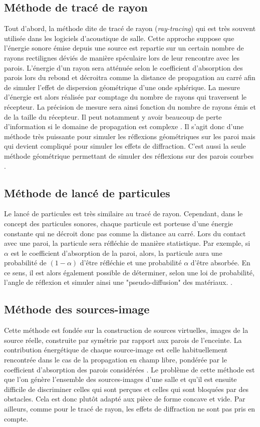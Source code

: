 	\subsection{Méthode de tracé de rayon}
Tout d'abord, la méthode dite de tracé de rayon (\textit{ray-tracing}) qui est très souvent utilisée dans les logiciels d'acoustique de salle. Cette approche suppose que l’énergie sonore émise depuis une source est repartie sur un certain nombre de rayons rectilignes déviés de manière spéculaire lors de leur rencontre avec les parois. L'énergie d'un rayon sera atténuée selon le coefficient d'absorption des parois lors du rebond et décroitra comme la distance de propagation au carré afin de simuler l'effet de dispersion géométrique d'une onde sphérique. La mesure d'énergie est alors réalisée par comptage du nombre de rayons qui traversent le récepteur. La précision de mesure sera ainsi fonction du nombre de rayons émis et de la taille du récepteur. Il peut notamment y avoir beaucoup de perte d'information si le domaine de propagation est complexe \cite[p. 60]{picaut}. Il s'agit donc d'une méthode très puissante pour simuler les réflexions géométriques sur les paroi mais qui devient compliqué pour simuler les effets de diffraction. C'est aussi la seule méthode géométrique permettant de simuler des réflexions sur des parois courbes \cite[p. 13]{Kandelman}.

	\subsection{Méthode de lancé de particules}
Le lancé de particules est très similaire au tracé de rayon. Cependant, dans le concept des particules sonores, chaque particule est porteuse d’une énergie constante qui ne décroit donc pas comme la distance au carré. Lors du contact avec une paroi, la particule sera réfléchie de manière statistique. Par exemple, si $\alpha$ est le coefficient d'absorption de la paroi, alors, la particule aura une probabilité de $(1-\alpha)$ d'être réfléchie et une probabilité $\alpha$ d'être absorbée. En ce sens, il est alors également possible de déterminer, selon une loi de probabilité, l'angle de réflexion et simuler ainsi une "pseudo-diffusion" des matériaux. \cite[p. 62]{picaut}.
	
	\subsection{Méthode des sources-image}
Cette méthode est fondée sur la construction de sources virtuelles, images de la source réelle, construite par symétrie par rapport aux parois de l'enceinte. La contribution énergétique de chaque source-image est celle habituellement rencontrée dans le cas de la propagation en champ libre, pondérée par le coefficient d’absorption des parois considérées \cite[p. 60]{picaut}.
Le problème de cette méthode est que l'on génère l'ensemble des sources-images d'une salle et qu'il est ensuite difficile de discriminer celles qui sont perçues et celles qui sont bloquées par des obstacles. Cela est donc plutôt adapté aux pièce de forme concave et vide. Par ailleurs, comme pour le tracé de rayon, les effets de diffraction ne sont pas pris en compte. 

